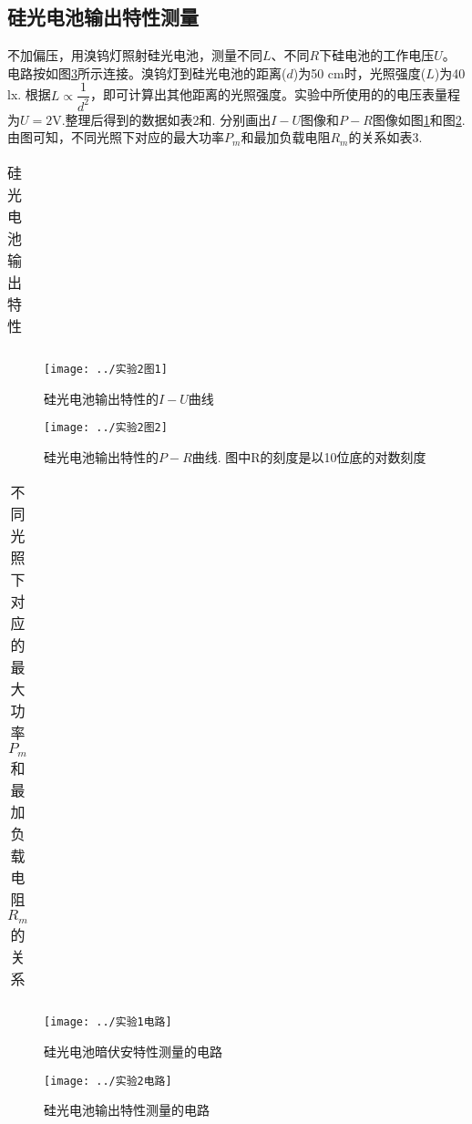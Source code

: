 \documentclass[11pt]{article}
\begin{document}
\subsection{硅光电池输出特性测量}
不加偏压，用溴钨灯照射硅光电池，测量不同$  L  $、不同$  R $下硅电池的工作电压$ U $。电路按如图\ref{fig:5}所示连接。溴钨灯到硅光电池的距离($ d $)为50 cm时，光照强度($ L $)为40 lx. 根据$ L \propto \dfrac{1}{d^2}  $，即可计算出其他距离的光照强度。实验中所使用的的电压表量程为$ U=2\text{V} $.整理后得到的数据如表2和. 分别画出$ I-U $图像和$ P-R $图像如图\ref{fig:21}和图\ref{fig:22}. 由图可知，不同光照下对应的最大功率$ P_m $和最加负载电阻$ R_m $的关系如表3.
\begin{table}[htbp]\small
	\label{table3}
	\caption{硅光电池输出特性}
	\begin{tabular}{ccccccccccccc}
	\end{tabular}
\end{table}
\begin{figure}[htbp]
	\centering
	\texttt{[image: ../实验2图1]}
	\caption{硅光电池输出特性的$ I-U $曲线}
	\label{fig:21}
\end{figure}
\begin{figure}[htbp]
	\centering
	\texttt{[image: ../实验2图2]}
	\caption{硅光电池输出特性的$ P-R $曲线. \kaishu 图中R的刻度是以10位底的对数刻度}
	\label{fig:22}
\end{figure}

\begin{table}[htbp]
	\centering
	\caption{不同光照下对应的最大功率$ P_m $和最加负载电阻$ R_m $的关系}
	\begin{tabular}{cccc}
	\end{tabular}
\end{table}
\begin{figure}[htbp]
	\centering
	\begin{minipage}{0.5\linewidth}
		\centering
		\texttt{[image: ../实验1电路]}
		\caption{硅光电池暗伏安特性测量的电路}
		\label{fig:4}
	\end{minipage}
	\begin{minipage}{0.4\linewidth}
		\centering
		\texttt{[image: ../实验2电路]}
		\caption{硅光电池输出特性测量的电路}
		\label{fig:5}
	\end{minipage}
\end{figure}
\end{document}
